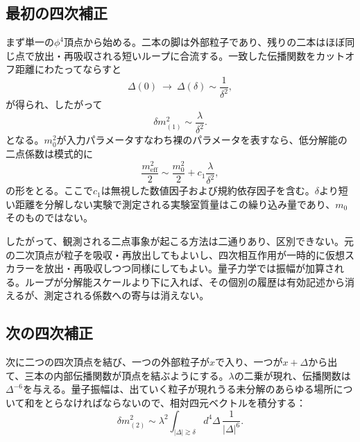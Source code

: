 \subsection{最初の四次補正}

まず単一の\(\phi^4\)頂点から始める。二本の脚は外部粒子であり、残りの二本はほぼ同じ点で放出・再吸収される短いループに合流する。一致した伝播関数をカットオフ距離にわたってならすと
\begin{equation}
\Delta(0)\ \longrightarrow\ \Delta(\delta)\sim\frac{1}{\delta^2},
\end{equation}
が得られ、したがって
\begin{equation}
\delta m^2_{(1)}\sim\frac{\lambda}{\delta^2}.
\label{eq:one-loop-scalar-mass}
\end{equation}
となる。\(m_0^2\)が入力パラメータすなわち裸のパラメータを表すなら、低分解能の二点係数は模式的に
\begin{equation}
\frac{m_{\mathrm{eff}}^2}{2}
\sim
\frac{m_0^2}{2}
+c_1\frac{\lambda}{\delta^2},
\label{eq:first-renormalized-mass}
\end{equation}
の形をとる。ここで\(c_1\)は無視した数値因子および規約依存因子を含む。\(\delta\)より短い距離を分解しない実験で測定される実験室質量はこの繰り込み量であり、\(m_0\)そのものではない。

したがって、観測される二点事象が起こる方法は二通りあり、区別できない。元の二次頂点が粒子を吸収・再放出してもよいし、四次相互作用が一時的に仮想スカラーを放出・再吸収しつつ同様にしてもよい。量子力学では振幅が加算される。ループが分解能スケールより下に入れば、その個別の履歴は有効記述から消えるが、測定される係数への寄与は消えない。

\subsection{次の四次補正}

次に二つの四次頂点を結び、一つの外部粒子が\(x\)で入り、一つが\(x+\Delta\)から出て、三本の内部伝播関数が頂点を結ぶようにする。\(\lambda\)の二乗が現れ、伝播関数は\(\Delta^{-6}\)を与える。量子振幅は、出ていく粒子が現れうる未分解のあらゆる場所について和をとらなければならないので、相対四元ベクトルを積分する：
\begin{equation}
\delta m^2_{(2)}
\sim
\lambda^2
\int_{|\Delta|\gtrsim\delta}
d^4\Delta\,\frac{1}{|\Delta|^6}.
\label{eq:two-loop-power-count}
\end{equation}

\begin{classroomqa}
\end{classroomqa}

